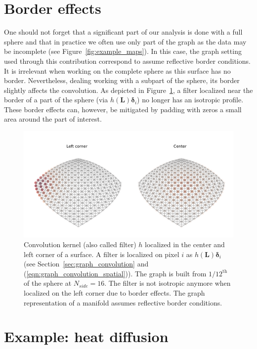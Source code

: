 \documentclass[final,twocolumn,3p,times,authoryear]{elsarticle}
\newcommand{\figref}[1]{Figure~\ref{fig:#1}}
\newcommand{\secref}[1]{Section~\ref{sec:#1}}
\newcommand{\eqnref}[1]{(\ref{eqn:#1})}
\renewcommand{\b}[1]{{\bm{#1}}}   %
\newcommand{\1}{\b{1}}              %
\newcommand{\0}{\b{0}}              %
\renewcommand{\L}{\b{L}}
\begin{document}
\section{Border effects}
\label{sec:border_effects}

One should not forget that a significant part of our analysis is done with a full sphere and that in practice we often use only part of the graph as the data may be incomplete (see \figref{example_maps}).
In this case, the graph setting used through this contribution correspond to assume reflective border conditions.
It is irrelevant when working on the complete sphere as this surface has no border. Nevertheless, dealing working with a subpart of the sphere, its border slightly affects the convolution.
As depicted in \figref{border_effects}, a filter localized near the border of a part of the sphere (via $h(\L) \b \delta_i$) no longer has an isotropic profile.
These border effects can, however, be mitigated by padding with zeros a small area around the part of interest.

\begin{figure}
	\centering
	\includegraphics[width=\linewidth]{border_effects}
	\caption{Convolution kernel (also called filter) $h$ localized in the center and left corner of a surface. A filter is localized on pixel $i$ as $h(\L) \b \delta_i$ (see \secref{graph_convolution} and \eqnref{graph_convolution_spatial}). The graph is built from $1/12^\text{th}$ of the sphere at $N_{side} = 16$. The filter is not isotropic anymore when localized on the left corner due to border effects. The graph representation of a manifold assumes reflective border conditions.}
	\label{fig:border_effects}
\end{figure}

\section{Example: heat diffusion}
\label{sec:heat_diffusion}
\label{sec:filter_visualization}
\end{document}
